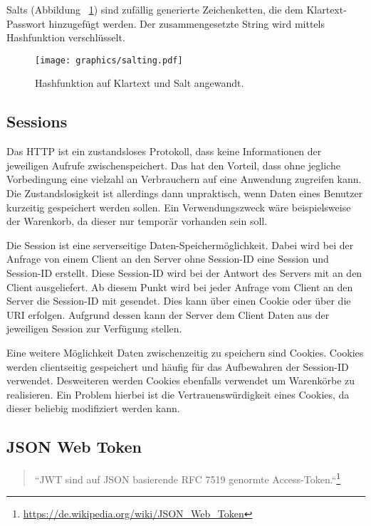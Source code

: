 Salts (Abbildung ~\ref{fig:salted-hash}) sind zufällig generierte Zeichenketten, die dem Klartext-Passwort hinzugefügt werden. Der zusammengesetzte String wird mittels Hashfunktion verschlüsselt.

\begin{figure}
	\centering
	\texttt{[image: graphics/salting.pdf]}
	\caption{Hashfunktion auf Klartext und Salt angewandt.}
	\label{fig:salted-hash}
\end{figure}

\subsection{Sessions}
\label{sec: sessions}
Das \gls{HTTP} ist ein zustandsloses Protokoll, dass keine Informationen der jeweiligen Aufrufe zwischenspeichert. Das hat den Vorteil, dass ohne jegliche Vorbedingung eine vielzahl an Verbrauchern auf eine Anwendung zugreifen kann. Die Zustandslosigkeit ist allerdings dann unpraktisch, wenn Daten eines Benutzer kurzeitig gespeichert werden sollen. Ein Verwendungszweck wäre beispielsweise der Warenkorb, da dieser nur temporär vorhanden sein soll.

Die Session ist eine serverseitige Daten-Speichermöglichkeit. Dabei wird bei der Anfrage von einem Client an den Server ohne Session-ID eine Session und Session-ID erstellt. Diese Session-ID wird bei der Antwort des Servers mit an den Client ausgeliefert. Ab diesem Punkt wird bei jeder Anfrage vom Client an den Server die Session-ID mit gesendet. Dies kann über einen Cookie oder über die \gls{URI} erfolgen. Aufgrund dessen kann der Server dem Client Daten aus der jeweiligen Session zur Verfügung stellen.

Eine weitere Möglichkeit Daten zwischenzeitig zu speichern sind Cookies. Cookies werden clientseitig gespeichert und häufig für das Aufbewahren der Session-ID verwendet. Desweiteren werden Cookies ebenfalls verwendet um Warenkörbe zu realisieren. Ein Problem hierbei ist die Vertrauenswürdigkeit eines Cookies, da dieser beliebig modifiziert werden kann.

\subsection{JSON Web Token}
\label{sec: jwt}

\begin{quote}
	``\gls{JWT} sind auf \gls{JSON} basierende \gls{RFC} 7519 genormte Access-Token.``\footnote{\url{https://de.wikipedia.org/wiki/JSON_Web_Token}}
\end{quote}

